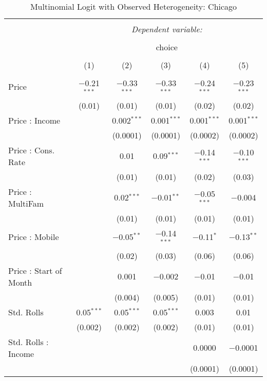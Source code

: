 
\begin{table}[!htbp] \centering 
  \caption{Multinomial Logit with Observed Heterogeneity: Chicago} 
  \label{tab:mnlChicagoObsHet} 
\begin{tabular}{@{\extracolsep{5pt}}lccccc} 
\\[-1.8ex]\hline 
\hline \\[-1.8ex] 
 & \multicolumn{5}{c}{\textit{Dependent variable:}} \\ 
\cline{2-6} 
\\[-1.8ex] & \multicolumn{5}{c}{choice} \\ 
\\[-1.8ex] & (1) & (2) & (3) & (4) & (5)\\ 
\hline \\[-1.8ex] 
 Price & $-$0.21$^{***}$ & $-$0.33$^{***}$ & $-$0.33$^{***}$ & $-$0.24$^{***}$ & $-$0.23$^{***}$ \\ 
  & (0.01) & (0.01) & (0.01) & (0.02) & (0.02) \\ 
  Price : Income &  & 0.002$^{***}$ & 0.001$^{***}$ & 0.001$^{***}$ & 0.001$^{***}$ \\ 
  &  & (0.0001) & (0.0001) & (0.0002) & (0.0002) \\ 
  Price : Cons. Rate &  & 0.01 & 0.09$^{***}$ & $-$0.14$^{***}$ & $-$0.10$^{***}$ \\ 
  &  & (0.01) & (0.01) & (0.02) & (0.03) \\ 
  Price : MultiFam &  & 0.02$^{***}$ & $-$0.01$^{**}$ & $-$0.05$^{***}$ & $-$0.004 \\ 
  &  & (0.01) & (0.01) & (0.01) & (0.01) \\ 
  Price : Mobile &  & $-$0.05$^{**}$ & $-$0.14$^{***}$ & $-$0.11$^{*}$ & $-$0.13$^{**}$ \\ 
  &  & (0.02) & (0.03) & (0.06) & (0.06) \\ 
  Price : Start of Month &  & 0.001 & $-$0.002 & $-$0.01 & $-$0.01 \\ 
  &  & (0.004) & (0.005) & (0.01) & (0.01) \\ 
  Std. Rolls & 0.05$^{***}$ & 0.05$^{***}$ & 0.05$^{***}$ & 0.003 & 0.01 \\ 
  & (0.002) & (0.002) & (0.002) & (0.01) & (0.01) \\ 
  Std. Rolls : Income &  &  &  & 0.0000 & $-$0.0001 \\ 
  &  &  &  & (0.0001) & (0.0001) \\ 

\end{tabular}
\end{table}
